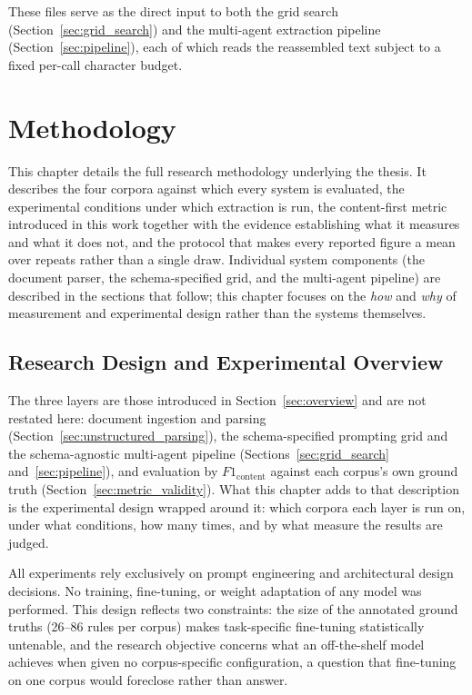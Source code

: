 \documentclass[11pt]{article}
\begin{document}
These files serve as the direct input to both the grid search
(Section~\ref{sec:grid_search}) and the
multi-agent extraction pipeline (Section~\ref{sec:pipeline}), each of which
reads the reassembled text subject to a fixed per-call character budget.

\section{Methodology}
\label{sec:evaluation}

This chapter details the full research methodology underlying the thesis.
It describes the four corpora against which every system is evaluated, the
experimental conditions under which extraction is run, the content-first metric
introduced in this work together with the evidence establishing what it measures
and what it does not, and the protocol that makes every reported figure a mean
over repeats rather than a single draw.
Individual system components (the document parser, the schema-specified grid,
and the multi-agent pipeline) are described in the sections that follow;
this chapter focuses on the \emph{how} and \emph{why} of measurement and
experimental design rather than the systems themselves.

\subsection{Research Design and Experimental Overview}
\label{sec:research_design}

The three layers are those introduced in Section~\ref{sec:overview} and are not
restated here: document ingestion and parsing
(Section~\ref{sec:unstructured_parsing}), the schema-specified prompting grid
and the schema-agnostic multi-agent pipeline
(Sections~\ref{sec:grid_search} and~\ref{sec:pipeline}), and evaluation by
$F1_{\text{content}}$ against each corpus's own ground truth
(Section~\ref{sec:metric_validity}). What this chapter adds to that description
is the experimental design wrapped around it: which corpora each layer is run
on, under what conditions, how many times, and by what measure the results are
judged.

All experiments rely exclusively on prompt engineering and architectural
design decisions.
No training, fine-tuning, or weight adaptation of any model was performed.
This design reflects two constraints: the size of the annotated ground truths
(26--86 rules per corpus) makes task-specific fine-tuning statistically
untenable, and the research objective concerns what an off-the-shelf model
achieves when given no corpus-specific configuration, a question that
fine-tuning on one corpus would foreclose rather than answer.
\end{document}
